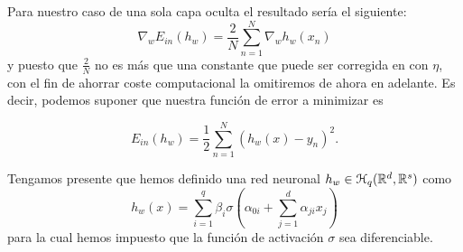 Para nuestro caso de una sola capa oculta el resultado sería el siguiente: 
\begin{equation}
    \nabla_w E_{in}(h_w) = \frac{2}{N} \sum^N_{n=1} \nabla_w h_w(x_n)
\end{equation}
y puesto que $\frac{2}{N}$ no es más que una constante que 
puede ser corregida en  con $\eta$, con el fin de ahorrar coste computacional la 
omitiremos de ahora en adelante. Es decir, podemos suponer que 
nuestra función de error a minimizar es 

\begin{equation}
    E_{in}(h_w) = \frac{1}{2} \sum^N_{n=1} (h_w(x)- y_n)^2. 
\end{equation}

Tengamos presente que hemos definido una red neuronal  $h_w \in \mathcal{H}_q (\mathbb{R}^d, \mathbb{R}^s)$ como
\begin{equation}
    h_w(x) = 
    \sum_{i=1}^q \beta_i 
    \sigma
    \left(  
        \alpha_{0 i} +
        \sum_{j=1}^d \alpha_{j i}x_j
    \right)
\end{equation}
para la cual hemos impuesto que la función de activación $\sigma$ sea diferenciable.

